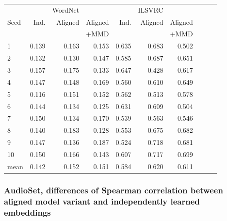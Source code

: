 \begin{table}[H]
\begin{tabular}{lrrrrrrrrr}
  \toprule
       &       &   WordNet &           &      &  ILSVRC   &            \\
{Seed} &  Ind. &   Aligned &  Aligned  & Ind. &   Aligned &  Aligned   \\
{}     &       &           & +MMD      &      &           &   +MMD     \\
\midrule
1    &    0.139 &  0.163 &   0.153 &   0.635 &  0.683 &   0.502 &   \\
2    &    0.132 &  0.130 &   0.147 &   0.585 &  0.687 &   0.651 &  \\
3    &    0.157 &  0.175 &   0.133 &   0.647 &  0.428 &   0.617 &  \\
4    &    0.147 &  0.148 &   0.169 &   0.560 &  0.610 &   0.649 &  \\
5    &    0.116 &  0.151 &   0.152 &   0.562 &  0.513 &   0.578 &  \\
6    &    0.144 &  0.134 &   0.125 &   0.631 &  0.609 &   0.504 &  \\
7    &    0.150 &  0.134 &   0.170 &   0.539 &  0.563 &   0.546 &  \\
8    &    0.140 &  0.183 &   0.128 &   0.553 &  0.675 &   0.682 &  \\
9    &    0.147 &  0.136 &   0.187 &   0.524 &  0.718 &   0.681 &  \\
10   &    0.150 &  0.166 &   0.143 &   0.607 &  0.717 &   0.699 &  \\
\midrule                                                                   
mean &    0.142 &  0.152 &   0.151 &   0.584 &  0.620 &   0.611 &  \\
\bottomrule
\end{tabular}
\end{table}



\subsubsection{AudioSet, differences of Spearman correlation between aligned model variant and independently learned embeddings}


